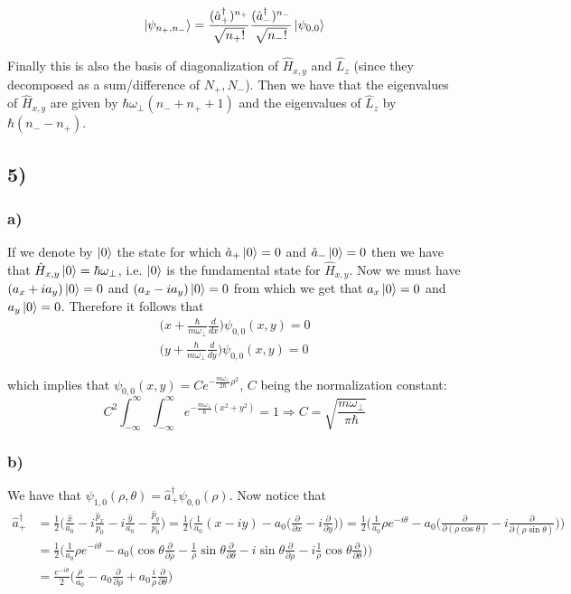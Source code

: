 \documentclass[10pt,a4paper]{book}
\newcommand{\p}{\partial}
\begin{document}
$$\ket{\psi_{n_+,n_-}}=\frac{(\hat{a}_+^{\dagger})^{n_+}}{\sqrt{n_+!}}\frac{(\hat{a}_-^{\dagger})^{n_-}}{\sqrt{n_-!}}\ket{\psi_{0,0}}$$

Finally this is also the basis of diagonalization of $\hat{H}_{x,y}$ and $\hat{L}_z$ (since they decomposed as a sum/difference of $N_+,N_-$). Then we have that the eigenvalues of $\hat{H}_{x,y}$ are given by $\hbar\omega_{\perp}(n_-+n_++1)$ and the eigenvalues of $\hat{L}_z$ by $\hbar(n_--n_+)$.

\subsection*{5)}

\subsubsection*{a)}

If we denote by $\ket{0}$ the state for which $\hat{a}_+\ket{0}=0$ and $\hat{a}_-\ket{0}=0$ then we have that $\hat{H}_{x,y}\ket{0}=\hbar\omega_{\perp}$, i.e. $\ket{0}$ is the fundamental state for $\hat{H}_{x,y}$. Now we must have $(a_x+ia_y)\ket{0}=0$ and $(a_x-ia_y)\ket{0}=0$ from which we get that $a_x\ket{0}=0$ and $a_y\ket{0}=0$. Therefore it follows that 
\begin{align*}
\bigg(x+\frac{\hbar}{m\omega_{\perp}}\frac{d}{dx}\bigg)\psi_{0,0}(x,y)=0\\
\bigg(y+\frac{\hbar}{m\omega_{\perp}}\frac{d}{dy}\bigg)\psi_{0,0}(x,y)=0
\end{align*}

which implies that $\psi_{0,0}(x,y)=Ce^{-\frac{m\omega_{\perp}}{2\hbar}\rho^2}$, $C$ being the normalization constant:
$$C^2\int_{-\infty}^{\infty}\int_{-\infty}^{\infty} e^{-\frac{m\omega_{\perp}}{\hbar}(x^2+y^2)}=1\Rightarrow C=\sqrt{\frac{m\omega_{\perp}}{\pi \hbar}}$$

\subsubsection*{b)}

We have that $\psi_{1,0}(\rho,\theta)=\hat{a}_+^{\dagger}\psi_{0,0}(\rho)$. Now notice that
\begin{align*}
\hat{a}_{+}^{\dagger}&=\frac{1}{2}\bigg(\frac{\hat{x}}{a_0}-i\frac{\hat{p}_x}{p_0}-i\frac{\hat{y}}{a_0}-\frac{\hat{p}_y}{p_0}\bigg)=\frac{1}{2}\bigg(\frac{1}{a_0}(x-iy)-a_0\bigg(\frac{\p}{\p x}-i\frac{\p}{\p y}\bigg)\bigg)=\frac{1}{2}\bigg(\frac{1}{a_0}\rho e^{-i\theta}-a_0\bigg(\frac{\p}{\p (\rho\cos\theta)}-i\frac{\p}{\p (\rho\sin\theta)}\bigg)\bigg)\\
&=\frac{1}{2}\bigg(\frac{1}{a_0}\rho e^{-i\theta}-a_0\bigg(\cos\theta\frac{\p}{\p\rho}-\frac{1}{\rho}\sin\theta\frac{\p}{\p\theta}-i\sin\theta\frac{\p}{\p \rho}-i\frac{1}{\rho}\cos\theta\frac{\p}{\p\theta}\bigg)\bigg)\\
&=\frac{e^{-i\theta}}{2}\bigg(\frac{\rho}{a_0}-a_0\frac{\p}{\p\rho}+a_0\frac{i}{\rho}\frac{\p}{\p\theta}\bigg)
\end{align*}
\end{document}
